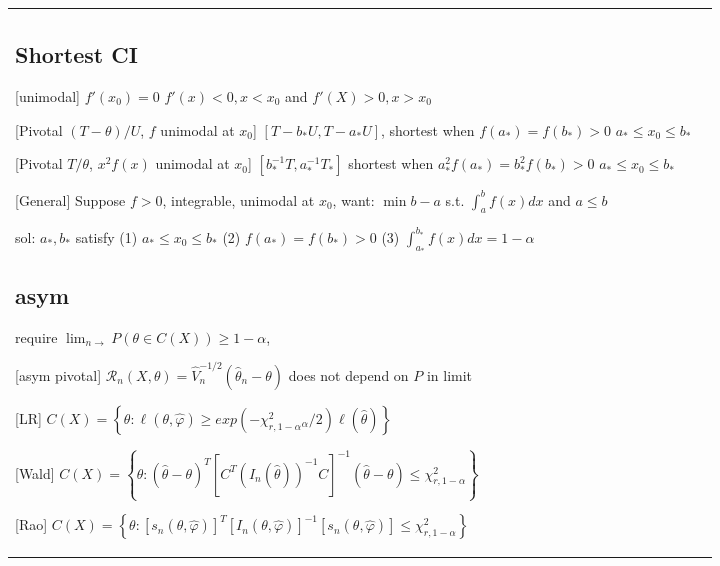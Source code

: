 \begin{tabulary}{\textwidth}{l || L}
	\subsection{Shortest CI}

	[unimodal]
	$f'(x_0) = 0$ $f'(x)<0, x < x_0$ and $f'(X)>0, x > x_0$

	[Pivotal $(T-\theta)/U$, $f$ unimodal at $x_0$]
	$[T - b_*U, T-a_* U]$, shortest when
	$f(a_*) = f(b_*) > 0$
	$a_* \leq x_0 \leq b_*$

	[Pivotal $T/\theta$, $x^2f(x)$ unimodal at $x_0$]
	$[b_*^{-1}T, a_*^{-1}T_*]$ shortest when
	$a^2_*f(a_*) = b^2_*f(b_*) > 0$
	$a_* \leq x_0 \leq b_*$

	[General]
	Suppose $f > 0$, integrable, unimodal at $x_0$,
	want: $\min b - a$ s.t.
	$\int_a^b f(x) dx$ and $a \leq b$

	sol: $a_*, b_*$ satisfy
	(1) $a_* \leq x_0 \leq b_*$
	(2) $f(a_*) = f(b_*) > 0$
	(3) $\int_{a_*}^{b_*} f(x) dx = 1- \alpha$
	\subsection{asym}
	require $\lim_{n\rightarrow}P(\theta\in C(X)) \geq 1 - \alpha$,

	[asym pivotal]
	$\mathcal{R}_n(X, \theta) = \hat V_n^{-1/2} (\hat\theta_n - \theta)$
	does not depend on $P$ in limit

		[LR]
	$C(X) = \left\{\theta: \ell(\theta, \hat\varphi) \geq
		exp(-\chi_{r, 1-\alpha}^2_\alpha/2)\ell(\hat\theta)\right\}$

	[Wald]
	$C(X) = \left\{
		\theta: (\hat\theta - \theta)^T \left[
			C^T \left(
			I_n(\hat\theta)
			\right)^{-1}
			C
			\right]^{-1}
		(\hat\theta - \theta) \leq \chi_{r, 1-\alpha}^2
		\right\}$

	[Rao]
	$C(X) = \left\{
		\theta:
		\left[ s_n(\theta, \hat\varphi) \right]^T
		\left[ I_n(\theta, \hat\varphi) \right]^{-1}
		\left[ s_n(\theta, \hat\varphi) \right]
		\leq \chi_{r, 1-\alpha}^2
		\right\}$

\end{tabulary}
